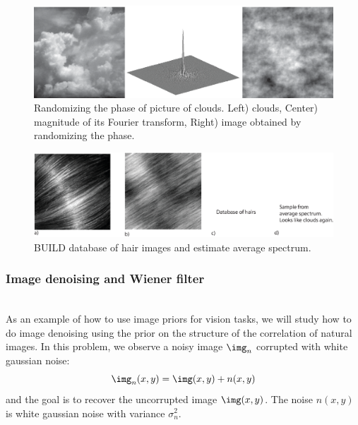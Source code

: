 \begin{figure}[htpb]
\centerline{
\includegraphics[width=1\linewidth]{figures/statistical_image_models/synthClouds.eps}
} 
\caption{Randomizing the phase of picture of clouds. Left) clouds, Center) magnitude of its Fourier transform, Right) image obtained by randomizing the phase.} 
\label{fig:synthClouds}
\end{figure}



\begin{figure}[htpb]
\centerline{
\includegraphics[width=1\linewidth]{figures/statistical_image_models/examplefailurehair.eps}
} 
\caption{BUILD database of hair images and estimate average spectrum.} 
\label{fig:hair}
\end{figure}


%
%
%

\subsubsection{Image denoising and Wiener filter}
~\\

As an example of how to use image priors for vision tasks, we will study how to do image denoising using the prior on the structure of the correlation of natural images. In this problem, we observe a noisy image $\img_n$ corrupted with white gaussian noise: 
\begin{equation}
\img_n(x,y) = \img(x,y) + n(x,y)
\end{equation}
and the goal is to recover the uncorrupted image $\img(x,y)$. The noise $n(x,y)$ is white gaussian noise with variance $\sigma_n^2$.

